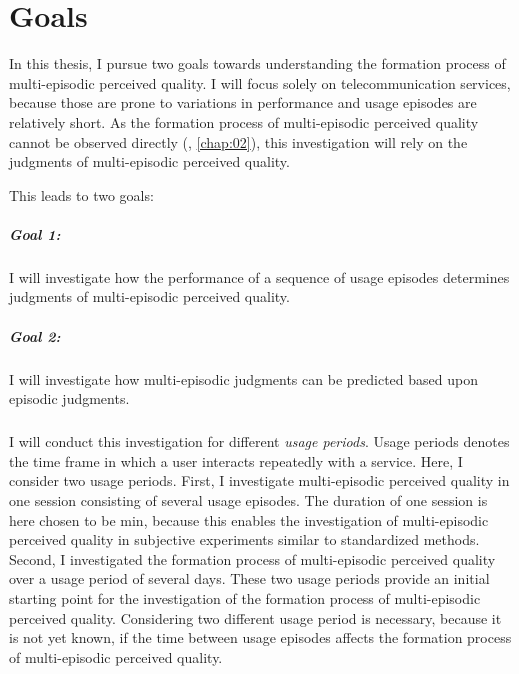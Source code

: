 
\section{Goals}
In this thesis, I pursue two goals towards understanding the formation process of multi-episodic perceived quality.
I will focus solely on telecommunication services, because those are prone to variations in performance and usage episodes are relatively short.
As the formation process of multi-episodic perceived quality cannot be observed directly (\cf, \autoref{chap:02}), this investigation will rely on the judgments of multi-episodic perceived quality.

This leads to two goals:

\subparagraph*{Goal 1:}
I will investigate how the performance of a sequence of usage episodes determines judgments of multi-episodic perceived quality.

\subparagraph*{Goal 2:}
I will investigate how multi-episodic judgments can be predicted based upon episodic judgments.

\subparagraph*{}
I will conduct this investigation for different \emph{usage periods}.
Usage periods denotes the time frame in which a user interacts repeatedly with a service.
Here, I consider two usage periods.
First, I investigate multi-episodic perceived quality in one session consisting of several usage episodes.
The duration of one session is here chosen to be \unit[45]{min}, because this enables the investigation of multi-episodic perceived quality in subjective experiments similar to standardized methods.
Second, I investigated the formation process of multi-episodic perceived quality over a usage period of several days.
These two usage periods provide an initial starting point for the investigation of the formation process of multi-episodic perceived quality.
Considering two different usage period is necessary, because it is not yet known, if the time between usage episodes affects the formation process of multi-episodic perceived quality.

